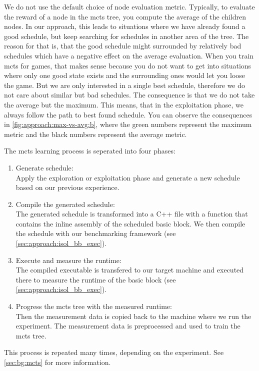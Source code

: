 We do not use the default choice of node evaluation metric.
Typically, to evaluate the reward of a node in the \ac{mcts} tree, you compute the average of the children nodes.
In our approach, this leads to situations where we have already found a good schedule, but keep searching for schedules in another area of the tree.
The reason for that is, that the good schedule might surrounded by relatively bad schedules which have a negative effect on the average evaluation.
When you train \ac{mcts} for games, that makes sense because you do not want to get into situations where only one good state exists and the surrounding ones would let you loose the game.
But we are only interested in a single best schedule, therefore we do not care about similar but bad schedules.
The consequence is that we do not take the average but the maximum.
This means, that in the exploitation phase, we always follow the path to best found schedule.
You can observe the consequences in \cref{fig:approach:max-vs-avg:b}, where the green numbers represent the maximum metric and the black numbers represent the average metric.

The \ac{mcts} learning process is seperated into four phases:
\begin{enumerate}
    \item Generate schedule: \\
    Apply the exploration or exploitation phase and generate a new schedule based on our previous experience.
    \item Compile the generated schedule: \\
    The generated schedule is transformed into a C++ file with a function that contains the inline assembly of the scheduled basic block.
    We then compile the schedule with our benchmarking framework (see \cref{sec:approach:isol_bb_exec}).
    \item Execute and measure the runtime: \\
    The compiled executable is transfered to our target machine and executed there to measure the runtime of the basic block (see \cref{sec:approach:isol_bb_exec}).
    \item Progress the \ac{mcts} tree with the measured runtime: \\
    Then the measurement data is copied back to the machine where we run the experiment.
    The measurement data is preprocessed and used to train the \ac{mcts} tree.
\end{enumerate}
This process is repeated many times, depending on the experiment.
See \cref{sec:bg:mcts} for more information.

